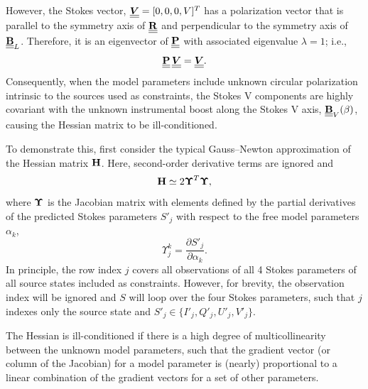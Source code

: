 However, the Stokes vector, $\underline{\underline{\mbox{\boldmath $V$}}}=[0,0,0,V]^T$ has a polarization vector that is parallel to the symmetry axis of $\underline{\underline{{\bf R}}}$ and perpendicular to the symmetry axis of $\underline{\underline{{\bf B}}}_L$. Therefore, it is
an eigenvector of $\underline{\underline{{\bf P}}}$ with associated eigenvalue $\lambda = 1$; i.e.,
%
\begin{equation}
\underline{\underline{{\bf P}}} \, \underline{\underline{\mbox{\boldmath $V$}}}=\underline{\underline{\mbox{\boldmath $V$}}}.
\end{equation}
%
Consequently, when the model parameters include unknown circular polarization intrinsic to the sources used as constraints, the Stokes V components
are highly covariant with the unknown instrumental boost along the Stokes V axis, $\underline{\underline{{\bf B}}}_V(\beta)$, causing the Hessian matrix to be ill-conditioned.

To demonstrate this, first consider the typical Gauss–Newton approximation of
the Hessian matrix ${\bf H}$.  Here, second-order derivative terms are ignored and
%
\begin{equation}
    {\bf H} \simeq 2 {\mbox{\boldmath $\Upsilon$}}^T{\mbox{\boldmath $\Upsilon$}},
\end{equation}
%
where ${\mbox{\boldmath $\Upsilon$}}$ is the Jacobian matrix with elements defined by the partial derivatives
of the predicted Stokes parameters $S'_j$ with respect to the free model parameters $\alpha_k$,
\begin{equation}
    \Upsilon_j^k = \frac{\partial S'_j}{\partial \alpha_k}.
\end{equation}
%
In principle, the row index $j$ covers all observations of all 4 Stokes parameters of all source states included as constraints.  However, for brevity, the observation index will be ignored and $S$ will loop over the four Stokes parameters, such that $j$ indexes only the source state and $S'_j \in \{ I'_j, Q'_j, U'_j, V'_j \}$.

The Hessian is ill-conditioned if there is a high degree of multicollinearity between the unknown model parameters, such that the gradient vector (or column of the Jacobian) for a model parameter is (nearly) proportional to a linear combination of the gradient vectors for a set of other parameters.

